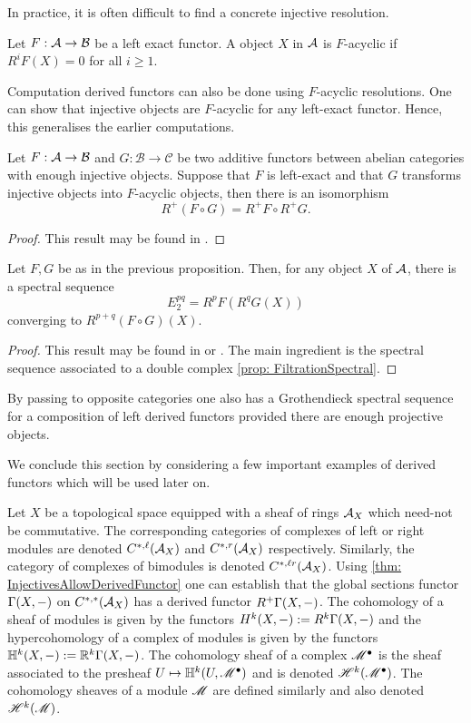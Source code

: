 In practice, it is often difficult to find a concrete injective resolution.
\begin{definition}
 Let $F:\AA \to \mathcal{B}$ be a left exact functor.
 A object $X$ in $\AA$ is $F$-acyclic if $R^iF(X) = 0$ for all $i\geq 1$.
\end{definition}
Computation derived functors can also be done using $F$-acyclic resolutions.
One can show that injective objects are $F$-acyclic for any left-exact functor.
Hence, this generalises the earlier computations.
\begin{proposition}\label{prop: GrothendieckIsomorphism}
  Let $F:\AA \to \mathcal{B}$ and $G:\mathcal{B}\to \mathcal{C}$ be two additive functors between abelian categories with enough injective objects. Suppose that $F$ is left-exact and that $G$ transforms injective objects into $F$-acyclic objects, then there is an isomorphism
  $$R^+(F\circ G) = R^+F \circ R^+ G.$$
\end{proposition}
\begin{proof}
  This result may be found in \cite[Chapter 1]{dimca2004sheaves}.
\end{proof}
\begin{theorem}
  Let $F,G$ be as in the previous proposition. Then, for any object $X$ of $\AA$, there is a spectral sequence
  $$E_2^{pq} = R^pF(R^qG(X)) $$
  converging to $R^{p+q}(F\circ G)(X).$
\end{theorem}
\begin{proof}
  This result may be found in \cite[Chapter 1]{dimca2004sheaves}  or \cite[Chapter 5]{weibel1995introduction}.
  The main ingredient is the spectral sequence associated to a double complex \cref{prop: FiltrationSpectral}.
\end{proof}
By passing to opposite categories one also has a Grothendieck spectral sequence for a composition of left derived functors provided there are enough projective objects.

We conclude this section by considering a few important examples of derived functors which will be used later on.

Let $X$ be a topological space equipped with a sheaf of rings $\AA_X$ which need-not be commutative.
The corresponding categories of complexes of left or right modules are denoted $C^{*,\ell}(\AA_X)$ and $C^{*,r}(\AA_X)$ respectively.
Similarly, the category of complexes of bimodules is denoted $C^{*,\ell r}(\AA_X)$.
Using \cref{thm: InjectivesAllowDerivedFunctor} one can establish that the global sections functor $\Gamma(X,\blank)$ on $C^{*,*}(\AA_X)$ has a derived functor $R^+\Gamma(X,\blank)$.
The cohomology of a sheaf of modules is given by the functors $H^k(X,\blank) := R^k \Gamma(X,\blank)$ and the hypercohomology of a complex of modules is given by the functors $\mathbb{H}^k(X,\blank):= \mathbb{R}^k\Gamma(X,\blank)$.
The cohomology sheaf of a complex $\M^\bullet$ is the sheaf associated to the presheaf $U\mapsto \mathbb{H}^k(U,\M^\bullet)$ and is denoted $\H^k(\M^\bullet)$.
The cohomology sheaves of a module $\M$ are defined similarly and also denoted $\H^k(\M)$.

